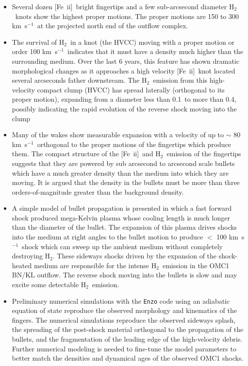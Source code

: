 \documentclass{aa}
\newcommand{\kms}{km~s{$^{-1}$}}
\newcommand{\Feii}{[Fe~{\sc ii}]}
\newcommand{\hh}{\ensuremath{\textrm{H}_{2}}}			%
\begin{document}
\begin{itemize}

\item  
Several dozen \Feii\ bright fingertips and a few sub-arcsecond diameter \hh\ 
knots show the highest proper motions.  The proper motions are 150 to
300 \kms\  at the  projected north end of the outflow complex.  

\item
The survival of \hh\ in a knot (the HVCC) moving with a proper motion or 
order 100 \kms\  indicates that it must have a density much higher than the 
surrounding medium. Over the last 6 years, this feature has shown dramatic 
morphological changes as it approaches a high velocity \Feii\ knot located  
several arcseconds father 
downstream.   The \hh\ emission from this  high-velocity compact clump (HVCC)
has spread laterally (orthogonal to its proper motion), expanding from a diameter 
less than 0.1\arcsec\ to more than 0.4\arcsec , possibly indicating the rapid
evolution of the reverse shock moving into the clump

\item
Many of the wakes show measurable expansion with a velocity of up to $\sim$
80 \kms\ orthogonal to the proper motions of the fingertips which produce them. 
The compact structure of the \Feii\ and \hh\ emission of the fingertips suggests
that they are powered by sub arcsecond to arcsecond scale bullets which have
a much greater density than the medium into which they are moving.    It is argued that
the density in the bullets must be more than three orders-of-magnitude greater than 
the background  density. 

\item
A simple model of bullet propagation is presented in which a fast forward shock
produced mega-Kelvin plasma whose cooling length is much longer than
the diameter of the bullet.  The expansion of this plasma drives shocks into
the medium at right angles to the bullet motion to produce $<$ 100 \kms\ shock
which can sweep up the ambient medium without completely destroying \hh .  These
sideways shocks driven by the expansion of the shock-heated medium are responsible
for the intense \hh\ emission in the OMC1 BN/KL outflow.   The reverse shock moving
into the bullets is slow and may excite some detectable \hh\ emission. 

\item
Preliminary numerical simulations with the \texttt{Enzo} code using an adiabatic equation 
of state reproduce the observed morphology and kinematics of the fingers. The
numerical simulations reproduce the observed sideways splash, the spreading
of the post-shock material orthogonal to the propagation of the bullets, and the 
fragmentation of the leading edge of the high-velocity debris.  Further numerical modeling
is needed to fine-tune the model parameters to better match the densities and
dynamical ages of the observed OMC1 shocks.



\end{itemize}
\end{document}
